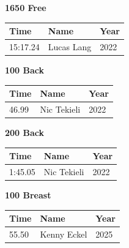 \vspace{1.2em}
\noindent\begin{minipage}[t]{0.48\textwidth}
\centering
\textbf{\textcolor{teamprimary}{1650 Free}}\par
\vspace{0.5em}
\centering
\small
\renewcommand{\arraystretch}{1.0}
\setlength{\tabcolsep}{4pt}
\begin{tabular}{@{}p{1.8cm}p{3.0cm}p{1.0cm}@{}}
\toprule
\textbf{Time} & \textbf{Name} & \textbf{Year} \\
\midrule
15:17.24 & Lucas Lang & 2022 \\
\bottomrule
\end{tabular}
\end{minipage}
\hfill
\begin{minipage}[t]{0.48\textwidth}
\centering
\textbf{\textcolor{teamprimary}{100 Back}}\par
\vspace{0.5em}
\centering
\small
\renewcommand{\arraystretch}{1.0}
\setlength{\tabcolsep}{4pt}
\begin{tabular}{@{}p{1.8cm}p{3.0cm}p{1.0cm}@{}}
\toprule
\textbf{Time} & \textbf{Name} & \textbf{Year} \\
\midrule
46.99 & Nic Tekieli & 2022 \\
\bottomrule
\end{tabular}
\end{minipage}
\vspace{1.2em}
\noindent\begin{minipage}[t]{0.48\textwidth}
\centering
\textbf{\textcolor{teamprimary}{200 Back}}\par
\vspace{0.5em}
\centering
\small
\renewcommand{\arraystretch}{1.0}
\setlength{\tabcolsep}{4pt}
\begin{tabular}{@{}p{1.8cm}p{3.0cm}p{1.0cm}@{}}
\toprule
\textbf{Time} & \textbf{Name} & \textbf{Year} \\
\midrule
1:45.05 & Nic Tekieli & 2022 \\
\bottomrule
\end{tabular}
\end{minipage}
\hfill
\begin{minipage}[t]{0.48\textwidth}
\centering
\textbf{\textcolor{teamprimary}{100 Breast}}\par
\vspace{0.5em}
\centering
\small
\renewcommand{\arraystretch}{1.0}
\setlength{\tabcolsep}{4pt}
\begin{tabular}{@{}p{1.8cm}p{3.0cm}p{1.0cm}@{}}
\toprule
\textbf{Time} & \textbf{Name} & \textbf{Year} \\
\midrule
55.50 & Kenny Eckel & 2025 \\
\bottomrule
\end{tabular}
\end{minipage}
